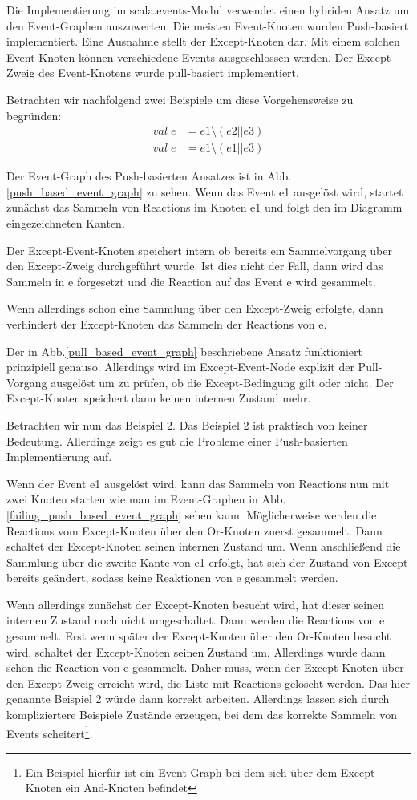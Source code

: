 Die Implementierung im scala.events-Modul verwendet einen hybriden Ansatz um den
Event-Graphen auszuwerten. Die meisten Event-Knoten wurden Push-basiert
implementiert. Eine Ausnahme stellt der Except-Knoten dar. Mit einem solchen
Event-Knoten können verschiedene Events ausgeschlossen werden. Der Except-Zweig
des Event-Knotens wurde pull-basiert implementiert.

Betrachten wir nachfolgend zwei Beispiele um diese Vorgehensweise zu begründen:
\begin{eqnarray}
val \; e & = e1 \setminus (e2 || e3)\\
val \; e & = e1 \setminus (e1 || e3)
\end{eqnarray}

Der Event-Graph des Push-basierten Ansatzes ist in
Abb.\ref{push_based_event_graph} zu sehen. Wenn das Event e1 ausgelöst wird,
startet zunächst das Sammeln von Reactions im Knoten e1 und folgt den im
Diagramm eingezeichneten Kanten. 
 
Der Except-Event-Knoten speichert intern ob bereits ein Sammelvorgang über den
Except-Zweig durchgeführt wurde. Ist dies nicht der Fall, dann wird das Sammeln
in e forgesetzt und die Reaction auf das Event e wird gesammelt. 

Wenn allerdings schon eine Sammlung über den Except-Zweig erfolgte, dann
verhindert der Except-Knoten das Sammeln der Reactions von e.

Der in Abb.\ref{pull_based_event_graph} beschriebene Ansatz funktioniert
prinzipiell genauso. Allerdings wird im Except-Event-Node explizit der Pull-Vorgang ausgelöst um zu
prüfen, ob die Except-Bedingung gilt oder nicht. Der Except-Knoten speichert
dann keinen internen Zustand mehr.

Betrachten wir nun das Beispiel 2. Das Beispiel 2 ist praktisch von keiner
Bedeutung. Allerdings zeigt es gut die Probleme einer Push-basierten
Implementierung auf. 

Wenn der Event e1 ausgelöst wird, kann das Sammeln von Reactions nun mit zwei
Knoten starten wie man im Event-Graphen in Abb.
\ref{failing_push_based_event_graph} sehen kann. Möglicherweise werden die
Reactions vom Except-Knoten über den Or-Knoten zuerst gesammelt. Dann schaltet 
der Except-Knoten seinen internen Zustand um. Wenn anschließend die Sammlung
über  die zweite Kante von e1 erfolgt, hat sich der Zustand von Except bereits 
geändert, sodass keine Reaktionen von e gesammelt werden.

Wenn allerdings zunächst der Except-Knoten besucht wird, hat dieser seinen
internen Zustand noch nicht umgeschaltet. Dann werden die Reactions von e
gesammelt. Erst wenn später der Except-Knoten über den Or-Knoten besucht wird,
schaltet der Except-Knoten seinen Zustand um. Allerdings wurde dann schon die
Reaction von e gesammelt. Daher muss, wenn der Except-Knoten über den
Except-Zweig erreicht wird, die Liste mit Reactions gelöscht werden. Das hier
genannte Beispiel 2 würde dann korrekt arbeiten. Allerdings lassen sich durch
kompliziertere Beispiele Zustände erzeugen, bei dem das korrekte Sammeln von
Events scheitert\footnote{Ein Beispiel hierfür ist ein Event-Graph bei dem sich
über dem Except-Knoten ein And-Knoten befindet}.

